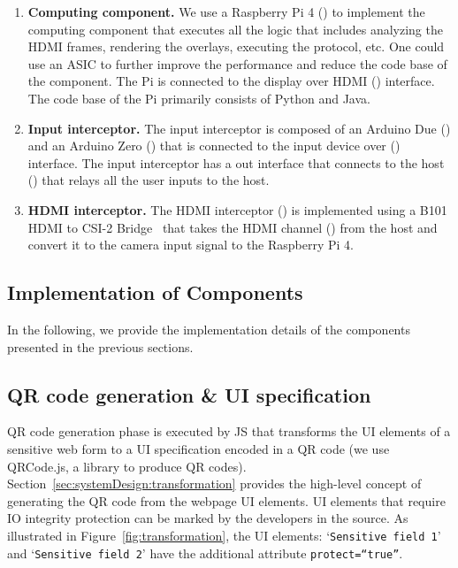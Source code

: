 \begin{enumerate}
 
  \item \textbf{Computing component.} We use a Raspberry Pi 4 (\six) to implement the computing component that executes all the \device logic that includes analyzing the HDMI frames, rendering the overlays, executing the \tls protocol, etc. One could use an ASIC to further improve the performance and reduce the code base of the component. The Pi is connected to the display over HDMI (\nine) interface. The code base of the Pi primarily consists of Python and Java.
  
  \item \textbf{Input interceptor.} The input interceptor is composed of an Arduino Due (\three) and an Arduino Zero (\four) that is connected to the input device over \usb (\two) interface. The input interceptor has a \usb out interface that connects to the host (\five) that relays all the user inputs to the host. 

  \item \textbf{HDMI interceptor.} The HDMI interceptor (\seven) is implemented using a B101 HDMI to CSI-2 Bridge~\cite{b101} that takes the HDMI channel (\eight) from the host and convert it to the camera input signal to the Raspberry Pi 4.  
 
\end{enumerate}

\subsection{Implementation of \name Components}
\label{appendix:implementation}


In the following, we provide the implementation details of the \name components presented in the previous sections. 

\subsection{QR code generation \& UI specification}
\label{sec:prototype:impl:qr}
%
QR code generation phase is executed by \name JS that transforms the UI elements of a sensitive web form to a UI specification encoded in a QR code (we use QRCode.js, a \js library to produce QR codes). Section~\ref{sec:systemDesign:transformation} provides the high-level concept of generating the QR code from the webpage UI elements. UI elements that require IO integrity protection can be marked by the developers in the \html source. As illustrated in Figure~\ref{fig:transformation}, the \html UI elements: `\texttt{Sensitive field 1}' and `\texttt{Sensitive field 2}' have the additional attribute \texttt{protect=``true''}. %

